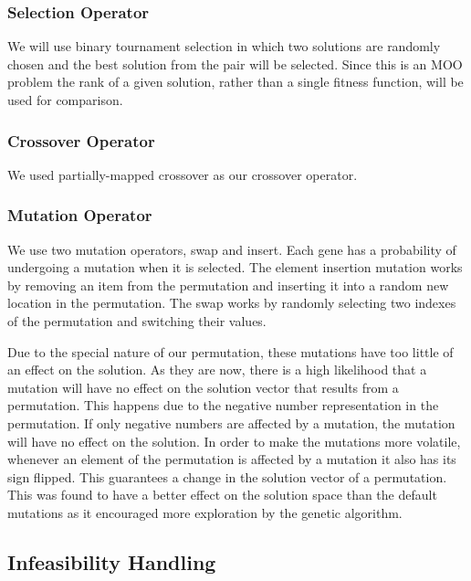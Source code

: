 \documentclass[conference]{IEEEtran}
\begin{document}
\subsubsection{Selection Operator}
\label{sec:Algorithms:Operators:Selection}
We will use binary tournament selection in which two solutions are randomly chosen and the best solution from the pair will be selected. Since this is an MOO problem the rank of a given solution, rather than a single fitness function, will be used for comparison.

\subsubsection{Crossover Operator}
\label{sec:Algorithms:Operators:Crossover}
We used partially-mapped crossover \cite{goldberg1985alleles} as our crossover operator.


\subsubsection{Mutation Operator}
\label{sec:Algorithms:Operators:Mutation}
We use two mutation operators, swap and insert. Each gene has a probability of undergoing a mutation when it is selected. The element insertion mutation works by removing an item from the permutation and inserting it into a random new location in the permutation. The swap works by randomly selecting two indexes of the permutation and switching their values.

Due to the special nature of our permutation, these mutations have too little of an effect on the solution. As they are now, there is a high likelihood that a mutation will have no effect on the solution vector that results from a permutation. This happens due to the negative number representation in the permutation. If only negative numbers are affected by a mutation, the mutation will have no effect on the solution. In order to make the mutations more volatile, whenever an element of the permutation is affected by a mutation it also has its sign flipped. This guarantees a change in the solution vector of a permutation. This was found to have a better effect on the solution space than the default mutations as it encouraged more exploration by the genetic algorithm.

\subsection{Infeasibility Handling}
\label{sec:Algorithms:Infeasibility}
\end{document}
